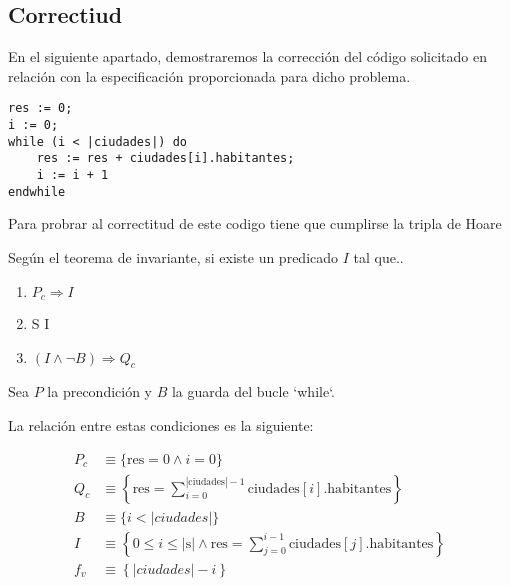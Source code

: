 \documentclass[10pt,a4paper]{article}
\begin{document}
\subsection{Correctiud}
En el siguiente apartado, demostraremos la corrección del código solicitado  en relación con la especificación proporcionada para dicho problema.  

\begin{lstlisting}
res := 0;
i := 0;
while (i < |ciudades|) do
	res := res + ciudades[i].habitantes;
	i := i + 1
endwhile
\end{lstlisting}


Para probrar al correctitud de este codigo tiene que cumplirse la tripla de Hoare 

Según el teorema de invariante, si existe un predicado $I$ tal que.. \par

\begin{enumerate}
	\item $P_c \Longrightarrow I$
	\item {} {S} {I}
	\item $(I \wedge  \neg B) \Longrightarrow Q_c$
\end{enumerate}

Sea \( P \) la precondición y \( B \) la guarda del bucle `while`.

La relación entre estas condiciones es la siguiente:

\begin{align*}
	P_c & \equiv \{ \text{res} = 0 \land i = 0 \}                                                                                   \\
	Q_c & \equiv \left\{ \text{res} = \sum_{i=0}^{|\text{ciudades}|-1} \text{ciudades}[i].\text{habitantes} \right\}                \\
	B   & \equiv \{ i < |ciudades| \}                                                                                               \\
	I   & \equiv \left\{ 0 \leq i \leq |\text{s}| \land \text{res} = \sum_{j=0}^{i-1} \text{ciudades}[j].\text{habitantes} \right\} \\
	f_v & \equiv \left\{ |ciudades| - i \right\}
\end{align*}
\end{document}
